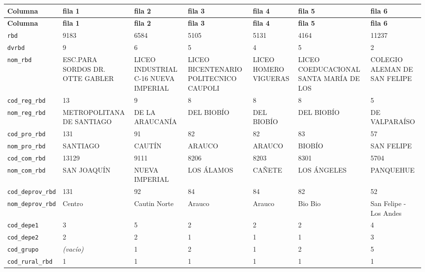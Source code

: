 \documentclass[10pt]{article}
\newcommand{\hdr}[1]{\textbf{\color{white}#1}}
\begin{document}
\footnotesize
\begin{xltabular}{\linewidth}{@{}p{4.3cm} Y Y Y Y Y Y @{}}
\hdr{Columna} & \hdr{fila 1} & \hdr{fila 2} & \hdr{fila 3} & \hdr{fila 4} & \hdr{fila 5} & \hdr{fila 6} \\
\endfirsthead
{}\hdr{Columna} & \hdr{fila 1} & \hdr{fila 2} & \hdr{fila 3} & \hdr{fila 4} & \hdr{fila 5} & \hdr{fila 6} \\
\endhead
{}\texttt{rbd} & 9183 & 6584 & 5105 & 5131 & 4164 & 11237 \\
\texttt{dvrbd} & 9 & 6 & 5 & 4 & 5 & 2 \\
\texttt{nom\_\allowbreak{}rbd} & ESC.PARA SORDOS DR. OTTE GABLER & LICEO INDUSTRIAL C-{}16 NUEVA IMPERIAL & LICEO BICENTENARIO POLITECNICO CAUPOLI & LICEO HOMERO VIGUERAS & LICEO COEDUCACIONAL SANTA MARÍA DE LOS & COLEGIO ALEMAN DE SAN FELIPE \\
\texttt{cod\_\allowbreak{}reg\_\allowbreak{}rbd} & 13 & 9 & 8 & 8 & 8 & 5 \\
\texttt{nom\_\allowbreak{}reg\_\allowbreak{}rbd} & METROPOLITANA DE SANTIAGO & DE LA ARAUCANÍA & DEL BIOBÍO & DEL BIOBÍO & DEL BIOBÍO & DE VALPARAÍSO \\
\texttt{cod\_\allowbreak{}pro\_\allowbreak{}rbd} & 131 & 91 & 82 & 82 & 83 & 57 \\
\texttt{nom\_\allowbreak{}pro\_\allowbreak{}rbd} & SANTIAGO & CAUTÍN & ARAUCO & ARAUCO & BIOBÍO & SAN FELIPE \\
\texttt{cod\_\allowbreak{}com\_\allowbreak{}rbd} & 13129 & 9111 & 8206 & 8203 & 8301 & 5704 \\
\texttt{nom\_\allowbreak{}com\_\allowbreak{}rbd} & SAN JOAQUÍN & NUEVA IMPERIAL & LOS ÁLAMOS & CAÑETE & LOS ÁNGELES & PANQUEHUE \\
\texttt{cod\_\allowbreak{}deprov\_\allowbreak{}rbd} & 131 & 92 & 84 & 84 & 82 & 52 \\
\texttt{nom\_\allowbreak{}deprov\_\allowbreak{}rbd} & Centro & Cautin Norte & Arauco & Arauco & Bio Bio & San Felipe -{} Los Andes \\
\texttt{cod\_\allowbreak{}depe1} & 3 & 5 & 2 & 2 & 2 & 4 \\
\texttt{cod\_\allowbreak{}depe2} & 2 & 2 & 1 & 1 & 1 & 3 \\
\texttt{cod\_\allowbreak{}grupo} & \textit{\color{gris}(vacío)} & 1 & 2 & 1 & 2 & 5 \\
\texttt{cod\_\allowbreak{}rural\_\allowbreak{}rbd} & 1 & 1 & 1 & 1 & 1 & 1 \\

\end{xltabular}
\end{document}
